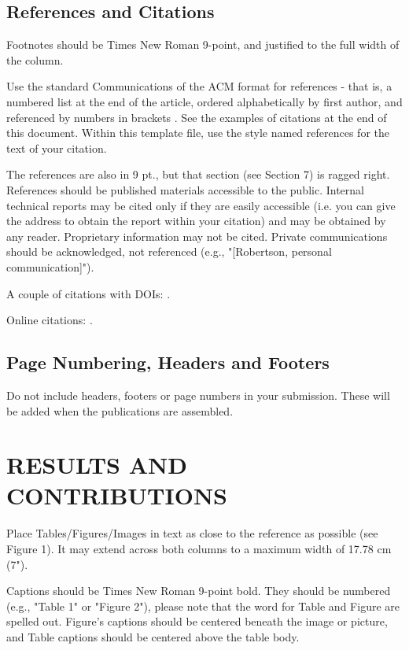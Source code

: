 \documentclass[sigconf]{acmart}
\begin{document}
\subsection*{References and Citations}
Footnotes should be Times New Roman 9-point, and justified to
the full width of the column.

Use the standard Communications of the ACM format for
references - that is, a numbered list at the end of the article,
ordered alphabetically by first author, and referenced by numbers
in brackets \cite{Smith10}. See the examples of citations at the end of this
document. Within this template file, use the style named
references for the text of your citation.

The references are also in 9 pt., but that section (see Section 7) is
ragged right. References should be published materials accessible
to the public. Internal technical reports may be cited only if they
are easily accessible (i.e. you can give the address to obtain the
report within your citation) and may be obtained by any reader.
Proprietary information may not be cited. Private communications
should be acknowledged, not referenced (e.g., "[Robertson,
personal communication]").

A couple of citations with DOIs: \cite{2004:ITE:1009386.1010128,
  Kirschmer:2010:AEI:1958016.1958018}. 

Online citations: \cite{TUGInstmem, Thornburg01, CTANacmart}.  

\subsection*{Page Numbering, Headers and Footers}
Do not include headers, footers or page numbers in your
submission. These will be added when the publications are
assembled.

\section*{RESULTS AND CONTRIBUTIONS}
Place Tables/Figures/Images in text as close to the reference as
possible (see Figure 1). It may extend across both columns to a
maximum width of 17.78 cm (7").

Captions should be Times New Roman 9-point bold. They should
be numbered (e.g., "Table 1" or "Figure 2"), please note that the
word for Table and Figure are spelled out. Figure's captions should be centered beneath the image or picture, and Table captions should be centered above the table body.


 
\end{document}
